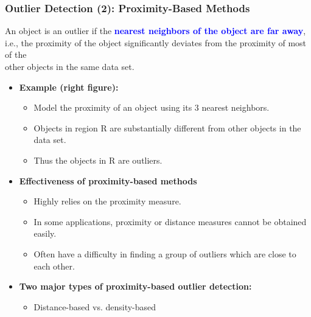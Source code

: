 \documentclass[aspectratio=169,t,xcolor=dvipsnames]{beamer}
\newcommand{\blue}[1]{\textbf{\textcolor{blue}{#1}}}
\begin{document}
\begin{frame}
	\frametitle{Outlier Detection (2): Proximity-Based Methods}
	
		An object is an outlier if the \blue{nearest neighbors of the object are far away},\\ i.e., the proximity of the object significantly deviates from the proximity of most of the\\ other objects in the same data set.
\begin{itemize}
	
	\item \textbf{Example (right figure):}
	\begin{itemize}
		\item Model the proximity of an object using its 3 nearest neighbors.
		\item Objects in region R are substantially different from other objects in the data set.
		\item Thus the objects in R are outliers.
	\end{itemize}
	\item \textbf{Effectiveness of proximity-based methods}
	\begin{itemize}
		\item Highly relies on the proximity measure.
		\item In some applications, proximity or distance measures cannot be obtained easily.
		\item Often have a difficulty in finding a group of outliers which are close to each other.
	\end{itemize}
	\item \textbf{Two major types of proximity-based outlier detection:}
	\begin{itemize}
		\item Distance-based vs. density-based
	\end{itemize}
\end{itemize}


\end{frame}
\end{document}
